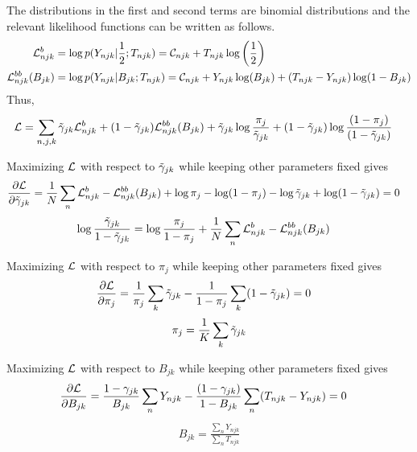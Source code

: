 \documentclass[reqno]{amsart}
\numberwithin{equation}{section}
\begin{document}
The distributions in the first and second terms are binomial distributions and the relevant likelihood functions can be written as follows.
\begin{align}
    \mathcal{L}^b_{njk} 
        &= \log p(Y_{njk} | \frac{1}{2}; T_{njk}) 
        = \mathcal{C}_{njk} + T_{njk} \log \left( \frac{1}{2} \right)\\
    \mathcal{L}^{bb}_{njk}(B_{jk}) 
        &= \log p(Y_{njk} | B_{jk}; T_{njk})
        = \mathcal{C}_{njk} + Y_{njk} \log(B_{jk}) + (T_{njk}-Y_{njk}) \log(1-B_{jk})
\end{align}
Thus,
\begin{align}
    \mathcal{L}
        &= \sum_{n,j,k} \tilde{\gamma}_{jk} \mathcal{L}^b_{njk} + (1-\tilde{\gamma}_{jk}) \mathcal{L}^{bb}_{njk}(B_{jk})
        + \tilde{\gamma}_{jk} \log \frac{\pi_j}{\tilde{\gamma}_{jk}} + (1-\tilde{\gamma}_{jk}) \log \frac{(1-\pi_j)}{(1-\tilde{\gamma}_{jk})}
\end{align}

Maximizing $\mathcal{L}$ with respect to $\tilde{\gamma}_{jk}$ while keeping other parameters fixed gives
\begin{align}
    \frac{\partial \mathcal{L}}{\partial \tilde{\gamma}_{jk}}
        &= \frac{1}{N} \sum_n \mathcal{L}^b_{njk} - \mathcal{L}^{bb}_{njk}(B_{jk}) + \log \pi_j - \log (1-\pi_j) - \log \tilde{\gamma}_{jk} + \log (1-\tilde{\gamma}_{jk}) = 0
\end{align}
\begin{align}
    \log \frac{\tilde{\gamma}_{jk}}{1-\tilde{\gamma}_{jk}}
        &= \log \frac{\pi_j}{1-\pi_j} + \frac{1}{N} \sum_n \mathcal{L}^b_{njk} - \mathcal{L}^{bb}_{njk}(B_{jk})
\end{align}

Maximizing $\mathcal{L}$ with respect to $\pi_j$ while keeping other parameters fixed gives
\begin{align}
    \frac{\partial \mathcal{L}}{\partial \pi_j}
        &= \frac{1}{\pi_j} \sum_k \tilde{\gamma}_{jk} - \frac{1}{1-\pi_j} \sum_k (1-\tilde{\gamma}_{jk}) = 0
\end{align}
\begin{align}
    \pi_j = \frac{1}{K} \sum_k \tilde{\gamma}_{jk}
\end{align}

Maximizing $\mathcal{L}$ with respect to $B_{jk}$ while keeping other parameters fixed gives
\begin{align}
    \frac{\partial \mathcal{L}}{\partial B_{jk}}
        &= \frac{1-\gamma_{jk}}{B_{jk}} \sum_n Y_{njk} - \frac{(1-\gamma_{jk})}{1-B_{jk}} \sum_n (T_{njk}-Y_{njk}) = 0
\end{align}
\begin{align}
    B_{jk} = \frac{\sum_n Y_{njk}}{\sum_n T_{njk}}
\end{align}
\end{document}
